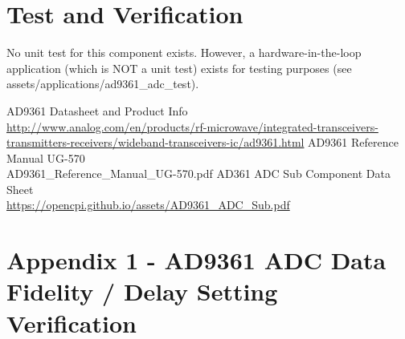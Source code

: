 \documentclass{article}
\begin{document}
\pagebreak
\section*{Test and Verification}
No unit test for this component exists. However, a hardware-in-the-loop
application (which is NOT a unit test) exists for testing purposes (see
assets/applications/ad9361\_adc\_test).

\begin{thebibliography}{1}

 AD9361 Datasheet and Product Info \\
\url{http://www.analog.com/en/products/rf-microwave/integrated-transceivers-transmitters-receivers/wideband-transceivers-ic/ad9361.html}
 AD9361 Reference Manual UG-570\\
AD9361\_Reference\_Manual\_UG-570.pdf
 AD361 ADC Sub Component Data Sheet \\
\url{https://opencpi.github.io/assets/AD9361_ADC_Sub.pdf}

\end{thebibliography}
\pagebreak
\section{Appendix 1 - AD9361 ADC Data Fidelity / Delay Setting Verification}
\end{document}
